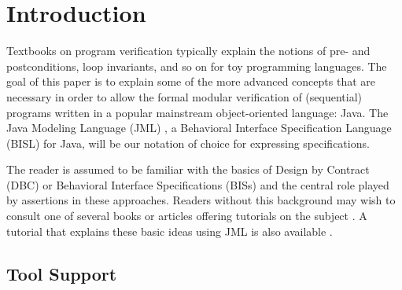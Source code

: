\documentclass{llncs}
\begin{document}
\section{Introduction}

Textbooks on program verification
 typically explain the
notions of pre- and postconditions, loop invariants, and so on for toy
programming languages.
%
The goal of this paper is to explain some of the more advanced concepts that
are necessary in order to allow the formal modular verification of
(sequential) programs written in a popular mainstream object-oriented
language: Java.
%
The Java Modeling Language (JML)
\cite{STTT05,Leavens-Baker-Ruby06,Leavens-etal05a}, a Behavioral Interface
Specification Language (BISL) \cite{Wing90a} for Java, will be our
notation of choice for expressing specifications.

The reader is assumed to be familiar with the basics of Design by
Contract (DBC) \cite{Meyer97} or Behavioral Interface Specifications (BISs)
and the central role played by assertions in these approaches.
%
Readers without this background may wish to consult one of several
books or articles offering tutorials on the subject
\cite{Hoare69,Liskov-Guttag01,Mitchell-McKim02,Meyer92a,Meyer97,Morgan94}.
%
A tutorial that explains these basic ideas using JML is also available
\cite{Leavens-Cheon05}.


\subsection{Tool Support}
%
%
\end{document}
